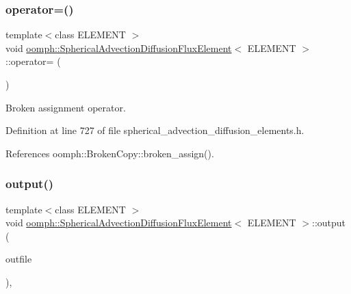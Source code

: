\mbox{\label{classoomph_1_1SphericalAdvectionDiffusionFluxElement_afbcbd2ed140bb94e69d518fcc60960d8}} 
\subsubsection{\texorpdfstring{operator=()}{operator=()}}
{\footnotesize\ttfamily template$<$class E\+L\+E\+M\+E\+NT $>$ \\
void \hyperlink{classoomph_1_1SphericalAdvectionDiffusionFluxElement}{oomph\+::\+Spherical\+Advection\+Diffusion\+Flux\+Element}$<$ E\+L\+E\+M\+E\+NT $>$\+::operator= (\begin{DoxyParamCaption}\item[{const \hyperlink{classoomph_1_1SphericalAdvectionDiffusionFluxElement}{Spherical\+Advection\+Diffusion\+Flux\+Element}$<$ E\+L\+E\+M\+E\+NT $>$ \&}]{ }\end{DoxyParamCaption})\hspace{0.3cm}{\ttfamily [inline]}}



Broken assignment operator. 



Definition at line 727 of file spherical\+\_\+advection\+\_\+diffusion\+\_\+elements.\+h.



References oomph\+::\+Broken\+Copy\+::broken\+\_\+assign().

\mbox{\label{classoomph_1_1SphericalAdvectionDiffusionFluxElement_a9ac365607431a072d3adc043cf057611}} 
\subsubsection{\texorpdfstring{output()}{output()}\hspace{0.1cm}{\footnotesize\ttfamily [1/2]}}
{\footnotesize\ttfamily template$<$class E\+L\+E\+M\+E\+NT $>$ \\
void \hyperlink{classoomph_1_1SphericalAdvectionDiffusionFluxElement}{oomph\+::\+Spherical\+Advection\+Diffusion\+Flux\+Element}$<$ E\+L\+E\+M\+E\+NT $>$\+::output (\begin{DoxyParamCaption}\item[{std\+::ostream \&}]{outfile }\end{DoxyParamCaption})\hspace{0.3cm}{\ttfamily [inline]}, {\ttfamily [virtual]}}



